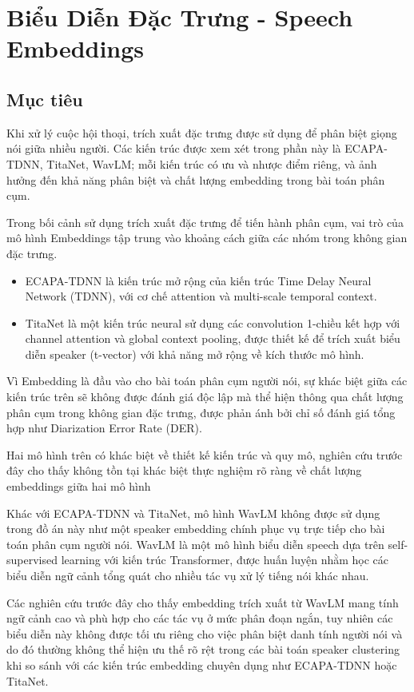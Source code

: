 \section{Biểu Diễn Đặc Trưng - Speech Embeddings}
\subsection{Mục tiêu}
Khi xử lý cuộc hội thoại, trích xuất đặc trưng được sử dụng để phân biệt giọng nói giữa nhiều người. Các kiến trúc được xem xét trong phần này là ECAPA-TDNN, TitaNet, WavLM; mỗi kiến trúc có ưu và nhược điểm riêng, và ảnh hưởng đến khả năng phân biệt và chất lượng embedding trong bài toán phân cụm. 

Trong bối cảnh sử dụng trích xuất đặc trưng để tiến hành phân cụm, vai trò của mô hình Embeddings tập trung vào khoảng cách giữa các nhóm trong không gian đặc trưng.
\begin{itemize}[label={}]
    \item ECAPA-TDNN là  kiến trúc mở rộng của kiến trúc Time Delay Neural Network (TDNN), với cơ chế attention và multi-scale temporal context.  
    \item TitaNet là một kiến trúc neural sử dụng các convolution 1-chiều kết hợp với channel attention và global context pooling, được thiết kế để trích xuất biểu diễn speaker (t-vector) với khả năng mở rộng về kích thước mô hình.
\end{itemize}
Vì Embedding là đầu vào cho bài toán phân cụm người nói, sự khác biệt giữa các kiến trúc trên sẽ không được đánh giá độc lập mà thể hiện thông qua chất lượng phân cụm trong không gian đặc trưng, được phản ánh bởi chỉ số đánh giá tổng hợp như Diarization Error Rate (DER). 

Hai mô hình trên có khác biệt về thiết kế kiến trúc và quy mô, nghiên cứu trước đây cho thấy không tồn tại khác biệt thực nghiệm rõ ràng về chất lượng embeddings giữa hai mô hình \cite{app14041329} 

Khác với ECAPA-TDNN và TitaNet, mô hình WavLM không được sử dụng trong đồ án này
như một speaker embedding chính phục vụ trực tiếp cho bài toán phân cụm người nói.
WavLM là một mô hình biểu diễn speech dựa trên self-supervised learning với kiến trúc
Transformer, được huấn luyện nhằm học các biểu diễn ngữ cảnh tổng quát cho nhiều
tác vụ xử lý tiếng nói khác nhau. 

Các nghiên cứu trước đây cho thấy embedding trích xuất từ WavLM mang tính ngữ cảnh
cao và phù hợp cho các tác vụ ở mức phân đoạn ngắn, tuy nhiên các biểu diễn này
không được tối ưu riêng cho việc phân biệt danh tính người nói và do đó thường
không thể hiện ưu thế rõ rệt trong các bài toán speaker clustering khi so sánh
với các kiến trúc embedding chuyên dụng như ECAPA-TDNN hoặc TitaNet. \cite{app14041329}
